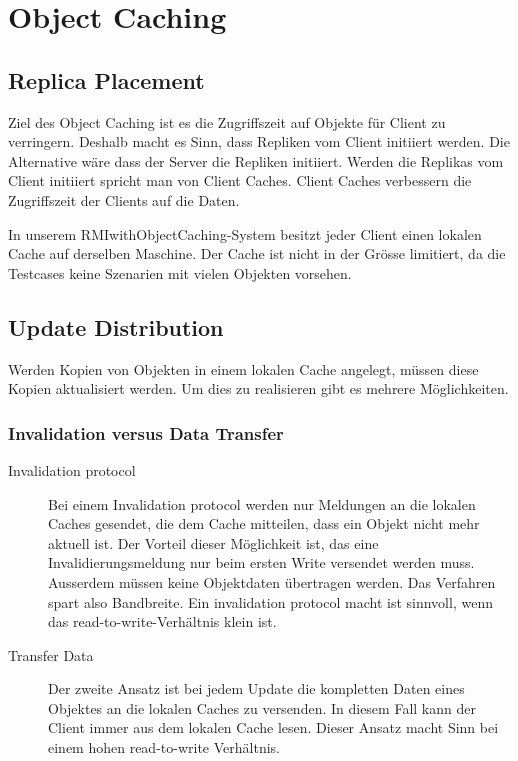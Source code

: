 
\section{Object Caching}
\label{sec:object-caching}

\subsection{Replica Placement}
\label{sec:replica-management}

Ziel des Object Caching ist es die Zugriffszeit auf Objekte für Client zu verringern. Deshalb macht es Sinn, dass Repliken vom Client initiiert werden. Die Alternative wäre dass der Server die Repliken initiiert. Werden die Replikas vom Client initiiert spricht man von Client Caches. Client Caches verbessern die Zugriffszeit der Clients auf die Daten.

In unserem RMIwithObjectCaching-System besitzt jeder Client einen lokalen Cache auf derselben Maschine. Der Cache ist nicht in der Grösse limitiert, da die Testcases keine Szenarien mit vielen Objekten vorsehen.

\subsection{Update Distribution}
\label{sec:update-distribution}

Werden Kopien von Objekten in einem lokalen Cache angelegt, müssen diese Kopien aktualisiert werden. Um dies zu realisieren gibt es mehrere Möglichkeiten.

\subsubsection{Invalidation versus Data Transfer}
\label{sec:inval-vers-data}

\begin{description}
\item[Invalidation protocol] Bei einem Invalidation protocol werden nur Meldungen an die lokalen Caches gesendet, die dem Cache mitteilen, dass ein Objekt nicht mehr aktuell ist. Der Vorteil dieser Möglichkeit ist, das eine Invalidierungsmeldung nur beim ersten Write versendet werden muss. Ausserdem müssen keine Objektdaten übertragen werden. Das Verfahren spart also Bandbreite. Ein invalidation protocol macht ist sinnvoll, wenn das read-to-write-Verhältnis klein ist.
\item[Transfer Data] Der zweite Ansatz ist bei jedem Update die kompletten Daten eines Objektes an die lokalen Caches zu versenden. In diesem Fall kann der Client immer aus dem lokalen Cache lesen. Dieser Ansatz macht Sinn bei einem hohen read-to-write Verhältnis.
\end{description}

